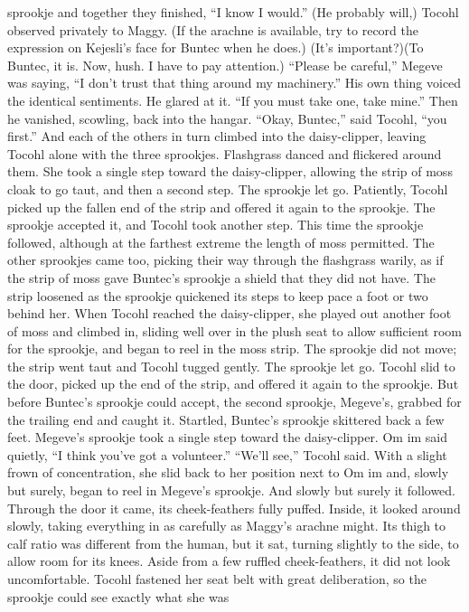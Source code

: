 \documentclass[9pt]{article}
\begin{document}
sprookje and together they finished, “I know I would.”
(He probably will,) Tocohl observed privately to Maggy. (If the arachne is available, try to record the
expression on Kejesli’s face for Buntec when he does.)
(It’s important?)(To Buntec, it is. Now, hush. I have to pay attention.)
“Please be careful,” Megeve was saying, “I don’t trust that thing around my machinery.” His own
thing voiced the identical sentiments. He glared at it. “If you must take one, take mine.” Then he vanished,
scowling, back into the hangar.
“Okay, Buntec,” said Tocohl, “you first.” And each of the others in turn climbed into the
daisy-clipper, leaving Tocohl alone with the three sprookjes. Flashgrass danced and flickered around
them.
She took a single step toward the daisy-clipper, allowing the strip of moss cloak to go taut, and then
a second step. The sprookje let go.
Patiently, Tocohl picked up the fallen end of the strip and offered it again to the sprookje. The
sprookje accepted it, and Tocohl took another step. This time the sprookje followed, although at the
farthest extreme the length of moss permitted.
The other sprookjes came too, picking their way through the flashgrass warily, as if the strip of moss
gave Buntec’s sprookje a shield that they did not have.
The strip loosened as the sprookje quickened its steps to keep pace a foot or two behind her. When
Tocohl reached the daisy-clipper, she played out another foot of moss and climbed in, sliding well over in
the plush seat to allow sufficient room for the sprookje, and began to reel in the moss strip. The sprookje
did not move; the strip went taut and Tocohl tugged gently. The sprookje let go. Tocohl slid to the door,
picked up the end of the strip, and offered it again to the sprookje. But before Buntec’s sprookje could
accept, the second sprookje, Megeve’s, grabbed for the trailing end and caught it. Startled, Buntec’s
sprookje skittered back a few feet.
Megeve’s sprookje took a single step toward the daisy-clipper.
Om im said quietly, “I think you’ve got a volunteer.”
“We’ll see,” Tocohl said. With a slight frown of concentration, she slid back to her position next to
Om im and, slowly but surely, began to reel in Megeve’s sprookje.
And slowly but surely it followed. Through the door it came, its cheek-feathers fully puffed. Inside, it
looked around slowly, taking everything in as carefully as Maggy’s arachne might.
Its thigh to calf ratio was different from the human, but it sat, turning slightly to the side, to allow room
for its knees. Aside from a few ruffled cheek-feathers, it did not look uncomfortable.
Tocohl fastened her seat belt with great deliberation, so the sprookje could see exactly what she was
\end{document}
